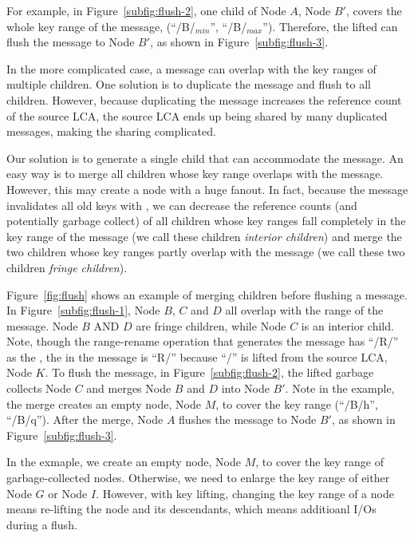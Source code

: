 For example, in Figure~\ref{subfig:flush-2}, one child of Node $A$, Node $B'$,
covers the whole key range of the \goto message,
(``/B/$_{min}$'', ``/B/$_{max}$'').
Therefore, the lifted \bedag can flush the \goto message to Node $B'$,
as shown in Figure~\ref{subfig:flush-3}.

In the more complicated case, a \goto message can overlap with the key ranges
of multiple children.
One solution is to duplicate the \goto message and flush to all children.
However,
because duplicating the \goto message increases the reference count of the
source LCA,
the source LCA ends up being shared by many duplicated \goto messages,
making the sharing complicated.

Our solution is to generate a single child that can accommodate the \goto
message.
An easy way is to merge all children whose key range overlaps with the
\goto message.
However, this may create a node with a huge fanout.
In fact, because the \goto message invalidates all old keys
with \dpre, we can decrease the reference counts
(and potentially garbage collect)
of all children whose key ranges fall completely in the key range of the \goto
message (we call these children \textit{interior children})
and merge the two children whose key ranges partly overlap with the
\goto message (we call these two children \textit{fringe children}).

Figure~\ref{fig:flush} shows an example of merging children before flushing a
\goto message.
In Figure~\ref{subfig:flush-1}, Node $B$, $C$ and $D$ all overlap with the
range of the \goto message.
Node $B$ AND $D$ are fringe children, while Node $C$ is an interior child.
Note, though the range-rename operation that generates the \goto message has
``/R/'' as the \spre, the \spre in the \goto message is ``R/'' because ``/'' is
lifted from the source LCA, Node $K$.
To flush the \goto message, in Figure~\ref{subfig:flush-2}, the lifted \bedag
garbage collects Node $C$ and merges Node $B$ and $D$ into Node $B'$.
Note in the example, the merge creates an empty node, Node $M$, to cover the key
range (``/B/h'', ``/B/q'').
After the merge, Node $A$ flushes the \goto message to Node $B'$, as shown in
Figure~\ref{subfig:flush-3}.

In the exmaple, we create an empty node, Node $M$, to cover the key range of
garbage-collected nodes.
Otherwise, we need to enlarge the key range of either Node $G$ or Node $I$.
However, with key lifting, changing the key range of a node means re-lifting
the node and its descendants, which means additioanl I/Os during a flush.

